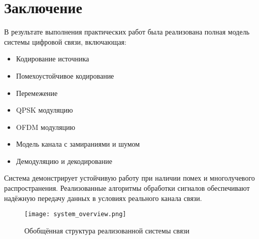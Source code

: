 \chapter*{Заключение}
\label{ch:conclusion}

В результате выполнения практических работ была реализована полная модель системы цифровой связи, включающая:

\begin{itemize}
    \item Кодирование источника
    \item Помехоустойчивое кодирование
    \item Перемежение
    \item QPSK модуляцию
    \item OFDM модуляцию
    \item Модель канала с замираниями и шумом
    \item Демодуляцию и декодирование
\end{itemize}

Система демонстрирует устойчивую работу при наличии помех и многолучевого распространения. Реализованные алгоритмы обработки сигналов обеспечивают надёжную передачу данных в условиях реального канала связи.

\begin{figure}[ht]
    \centering
    \texttt{[image: system\_overview.png]}
    \caption{Обобщённая структура реализованной системы связи}
    \label{fig:system_overview}
\end{figure}
